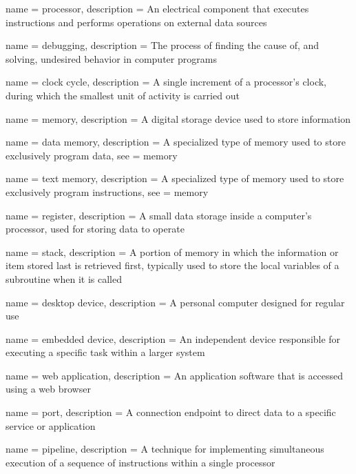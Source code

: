  {
  name = {processor},
  description = {An electrical component that executes instructions and performs operations on external data sources}
}

 {
  name = {debugging},
  description = {The process of finding the cause of, and solving, undesired behavior in computer programs}
}

 {
  name = {clock cycle},
  description = {A single increment of a processor's clock, during which the smallest unit of activity is carried out}
}

 {
  name = {memory},
  description = {A digital storage device used to store information}
}

 {
  name = {data memory},
  description = {A specialized type of memory used to store exclusively program data},
  see = {memory}
}

 {
  name = {text memory},
  description = {A specialized type of memory used to store exclusively program instructions},
  see = {memory}
}

 {
  name = {register},
  description = {A small data storage inside a computer's processor, used for storing data to operate}
}

 {
  name = {stack},
  description = {A portion of memory in which the information or item stored last is retrieved first, typically used to store the local variables of a subroutine when it is called}
}

 {
  name = {desktop device},
  description = {A personal computer designed for regular use}
}

 {
  name = {embedded device},
  description = {An independent device responsible for executing a specific task within a larger system}
}

 {
  name = {web application},
  description = {An application software that is accessed using a web browser}
}

 {
  name = {port},
  description = {A connection endpoint to direct data to a specific service or application}
}

 {
  name = {pipeline},
  description = {A technique for implementing simultaneous execution of a sequence of instructions within a single processor}
}

